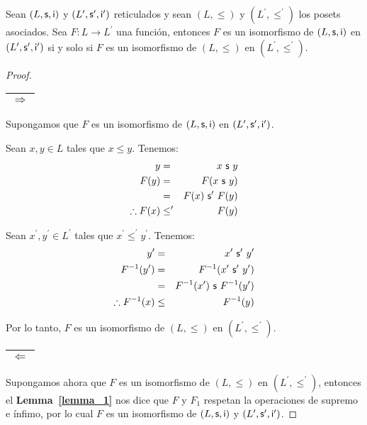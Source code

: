   \begin{lemma}
    \PN Sean $(L, \mathsf{s}, \mathsf{i})$ y $(L^{\prime}, \mathsf{s}^{\prime}, \mathsf{i}^{\prime})$ reticulados y sean $(L, \leq)$ y $(L^{\prime},
    \leq^{\prime})$ los posets asociados. Sea $F: L \rightarrow L^{\prime}$ una función, entonces $F$ es un isomorfismo
    de $(L, \mathsf{s}, \mathsf{i})$ en $ (L^{\prime}, \mathsf{s}^{\prime}, \mathsf{i}^{\prime})$ si y solo si $F$ es un isomorfismo de $(L, \leq)$
    en $(L^{\prime}, \leq^{\prime})$.
  \end{lemma}
  \begin{proof}
    \PN \begin{tabular}{|c|} \hline $\Rightarrow$ \\\hline \end{tabular} Supongamos que $F$ es un isomorfismo de
    $(L, \mathsf{s}, \mathsf{i})$ en $ (L^{\prime}, \mathsf{s}^{\prime}, \mathsf{i}^{\prime})$.

    \PN Sean $x, y \in L$ tales que $x \leq y$. Tenemos:
    \begin{eqnarray*}
      y &=& x \ \mathsf{s} \ y \\
      F(y) &=& F(x \ \mathsf{s} \ y) \\
      &=& F(x) \ \mathsf{s}^{\prime} \ F(y) \\
      \therefore F(x) &\leq^{\prime}& F(y)
    \end{eqnarray*}

    \PN Sean $x^{\prime}, y^{\prime} \in L^{\prime}$ tales que $x^{\prime} \leq^{\prime} y^{\prime}$. Tenemos:
    \begin{eqnarray*}
      y^{\prime} &=& x^{\prime} \ \SU^{\prime} \ y^{\prime} \\
      F^{-1}(y^{\prime}) &=& F^{-1}(x^{\prime} \ \SU^{\prime} \ y^{\prime}) \\
      &=& F^{-1}(x^{\prime}) \ \SU \ F^{-1}(y^{\prime}) \\
      \therefore F^{-1}(x) &\leq& F^{-1}(y)
    \end{eqnarray*}

    \PN Por lo tanto, $F$ es un isomorfismo de $(L, \leq)$ en $(L^{\prime}, \leq^{\prime})$.

    \PN \begin{tabular}{|c|} \hline $\Leftarrow$ \\\hline \end{tabular} Supongamos ahora que $F$ es un isomorfismo
    de $(L, \leq)$ en $(L^{\prime}, \leq^{\prime})$, entonces el \textbf{Lemma~\ref{lemma_1}} nos dice que $F$ y
    $F_{1}$ respetan la operaciones de supremo e ínfimo, por lo cual $F$ es un isomorfismo de $(L, \mathsf{s}, \mathsf{i})$ y
    $(L^{\prime}, \mathsf{s}^{\prime}, \mathsf{i}^{\prime})$.
  \end{proof}

